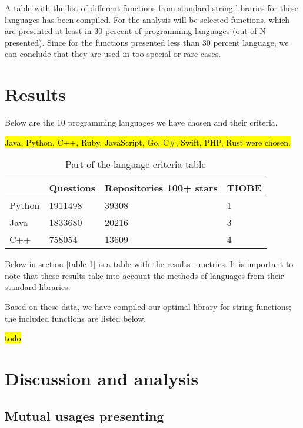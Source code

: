 \documentclass[anonymous,sigplan,review,11pt,nonacm,natbib=false]{acmart}
\begin{document}
    A table with the list of different functions from standard string libraries for these languages has been compiled. For the analysis will be selected functions, which are presented at least in 30 percent of programming languages (out of N presented). Since for the functions presented less than 30 percent language, we can conclude that they are used in too special or rare cases.



    \section{Results}

    Below are the 10 programming languages we have chosen and their criteria.

    \hl{Java, Python, C++, Ruby, JavaScript, Go, C\#, Swift, PHP, Rust were chosen.}


    \begin{table}[h]
        \begin{tabular}{llll}
            \hline
            & Questions
            & Repositories 100+ stars
            & TIOBE
            \\ \hline

            Python & 1911498 & 39308 & 1 \\

            Java & 1833680 & 20216 & 3 \\

            C++ & 758054 & 13609 & 4 \\ \hline
        \end{tabular}
        \caption{Part of the language criteria table}
    \end{table}

    Below in section \ref{table 1} is a table with the results - metrics. It is important to note that these results take into account the methods of languages from their standard libraries.

    Based on these data, we have compiled our optimal library for string functions; the included functions are listed below.

    \hl{todo}

    \section{Discussion and analysis}

    \subsection{Mutual usages presenting}
\end{document}
